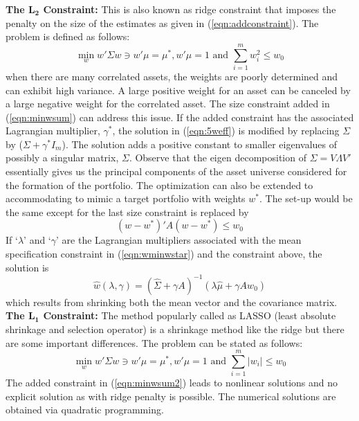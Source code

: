 \noindent \textbf{The $\mathbf{L_2}$ Constraint:} This is also known as ridge constraint that imposes the penalty on the size of the estimates as given in (\ref{eqn:addconstraint}). The problem is defined as follows:
	\begin{equation}\label{eqn:minwsum}
	\min_w w' \Sigma w \ni w' \mu=\mu^*, w'\mu=1 \text{ and }\sum_{i=1}^m w_i^2 \leq w_0
	\end{equation}
when there are many correlated assets, the weights are poorly determined and can exhibit high variance. A large positive weight for an asset can be canceled by a large negative weight for the correlated asset. The size constraint added in (\ref{eqn:minwsum}) can address this issue. If the added constraint has the associated Lagrangian multiplier, $\gamma^*$, the solution in (\ref{eqn:5weff}) is modified by replacing $\Sigma$ by ($\Sigma + \gamma^* I_m$). The solution adds a positive constant to smaller eigenvalues of possibly a singular matrix, $\Sigma$. Observe that the eigen decomposition of $\Sigma= V \Lambda V'$ essentially gives us the principal components of the asset universe considered for the formation of the portfolio. The optimization can also be extended to accommodating to mimic a target portfolio with weights $w^*$. The set-up would be the same except for the last size constraint is replaced by
	\begin{equation}\label{eqn:wminwstar}
	(w-w^*)' A(w-w^*) \leq w_0
	\end{equation}
If `$\lambda$' and `$\gamma$' are the Lagrangian multipliers associated with the mean specification constraint in (\ref{eqn:wminwstar}) and the constraint above, the solution is
	\begin{equation}\label{eqn:hatwlambdagamma}
	\hat{w}(\lambda,\gamma)=(\hat{\Sigma} + \gamma A)^{-1} (\lambda \hat{\mu} + \gamma A w_0)
	\end{equation}
which results from shrinking both the mean vector and the covariance matrix. \\

\noindent \textbf{The $\mathbf{L_1}$ Constraint:} The method popularly called as LASSO (least absolute shrinkage and selection operator) is a shrinkage method like the ridge but there are some important differences. The problem can be stated as follows:
	\begin{equation}\label{eqn:minwsum2}
	\min_w w'\Sigma w \ni w'\mu=\mu^*, w'\mu=1 \text{ and } \sum_{i=1}^m |w_i| \leq w_0
	\end{equation}
The added constraint in (\ref{eqn:minwsum2}) leads to nonlinear solutions and no explicit solution as with ridge penalty is possible. The numerical solutions are obtained via quadratic programming.



